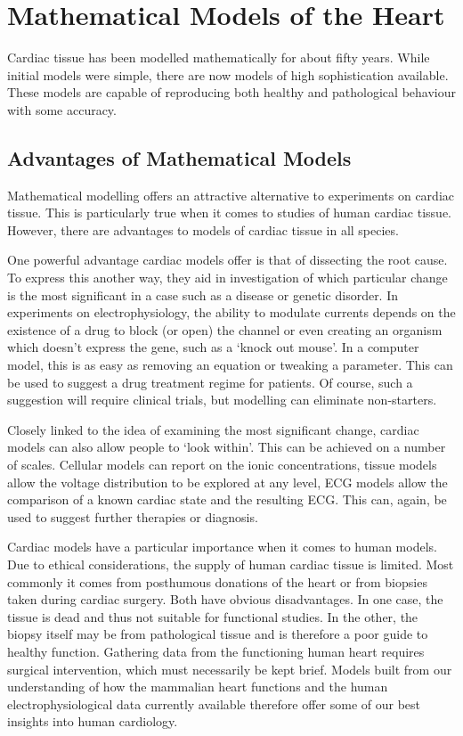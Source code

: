\section{Mathematical Models of the Heart}

Cardiac tissue has been modelled mathematically for about fifty years.
While initial models were simple, there are now models of high sophistication
available.
These models are capable of reproducing both healthy and pathological behaviour
with some accuracy.

\subsection{Advantages of Mathematical Models}

Mathematical modelling offers an attractive alternative to experiments on
cardiac tissue.
This is particularly true when it comes to studies of human cardiac tissue.
However, there are advantages to models of cardiac tissue in all species.

One powerful advantage cardiac models offer is that of dissecting the root cause.
To express this another way, they aid in investigation of which particular
change is the most significant in a case such as a disease or genetic disorder.
In experiments on electrophysiology, the ability to modulate currents depends on
the existence of a drug to block (or open) the channel or even creating an
organism which doesn't express the gene, such as a `knock out mouse'.
In a computer model, this is as easy as removing an equation or tweaking a
parameter.
This can be used to suggest a drug treatment regime for patients.
Of course, such a suggestion will require clinical trials, but modelling can
eliminate non-starters.

Closely linked to the idea of examining the most significant change, cardiac
models can also allow people to `look within'.
This can be achieved on a number of scales.
Cellular models can report on the ionic concentrations, tissue models allow the
voltage distribution to be explored at any level, ECG models allow the
comparison of a known cardiac state and the resulting ECG.
This can, again, be used to suggest further therapies or diagnosis.

Cardiac models have a particular importance when it comes to human models.
Due to ethical considerations, the supply of human cardiac tissue is limited.
Most commonly it comes from posthumous donations of the heart or from biopsies
taken during cardiac surgery.
Both have obvious disadvantages.
In one case, the tissue is dead and thus not suitable for functional studies.
In the other, the biopsy itself may be from pathological tissue and is therefore a
poor guide to healthy function.
Gathering data from the functioning human heart requires surgical intervention,
which must necessarily be kept brief.
Models built from our understanding of how the mammalian heart functions and
the human electrophysiological data currently available therefore offer some of
our best insights into human cardiology.

